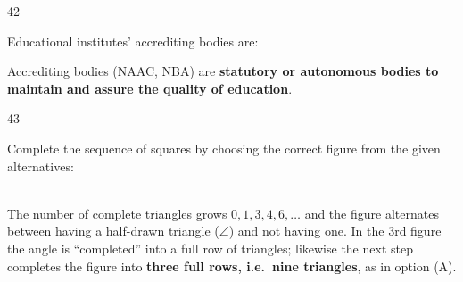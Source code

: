 \begin{question}{42}
{Educational institutes' accrediting bodies are:\par}
\begin{explain}
Accrediting bodies (NAAC, NBA) are \textbf{statutory or autonomous bodies to maintain and assure the quality of education}.
\end{explain}
\end{question}

\begin{question}{43}
{Complete the sequence of squares by choosing the correct figure from the given alternatives:\\[3pt]
\centering
\newcommand{\sq}[1]{\framebox[1.1cm][c]{\rule{0pt}{0.8cm}\parbox[c]{1cm}{\centering\tiny #1}}}
\sq{$\angle$}\,\sq{$\triangle\angle$}\,\sq{$\triangle\triangle\triangle$}\,\sq{$\triangle\triangle\triangle$\\$\triangle\angle$}\,\sq{$\triangle\triangle\triangle$\\$\triangle\triangle\triangle$\\$\angle$}\,\sq{?}\par}
\optsfour{\framebox{\parbox{0.9cm}{\centering\tiny$\triangle\triangle\triangle$\\$\triangle\triangle\triangle$\\$\triangle\triangle\triangle$}}}{\framebox{\parbox{0.9cm}{\centering\tiny$\triangle\triangle\triangle$\\$\triangle\triangle\triangle$\\$\triangle\triangle\triangle$\\$\triangle\angle$}}}{\framebox{\parbox{0.9cm}{\centering\tiny$\triangle\triangle\triangle$\\$\triangle\triangle\triangle$\\$\triangle\triangle\triangle$\\$\triangle\triangle\angle$}}}{\framebox{\parbox{0.9cm}{\centering\tiny$\triangle\triangle\triangle$\\$\triangle\triangle\triangle$\\$\triangle\angle\angle$}}}
\begin{explain}
The number of complete triangles grows $0, 1, 3, 4, 6, \ldots$ and the figure alternates between having a half-drawn triangle ($\angle$) and not having one. In the 3rd figure the angle is ``completed'' into a full row of triangles; likewise the next step completes the figure into \textbf{three full rows, i.e.\ nine triangles}, as in option (A).
\end{explain}
\end{question}

